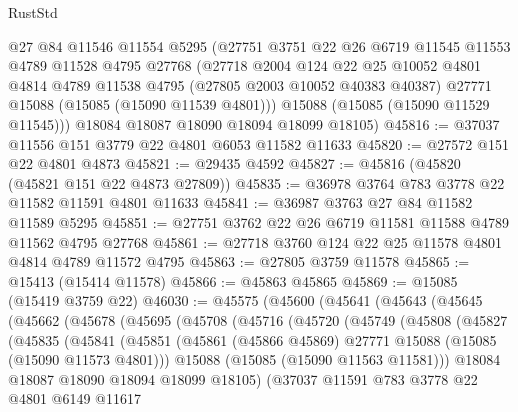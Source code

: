 \begin{lexlean}{RustStd}
\begin{coremodule}
      @27
      @84
      @11546
      @11554
      @5295
      (@27751
        @3751
        @22
        @26
        @6719
        @11545
        @11553
        @4789
        @11528
        @4795
        @27768
        (@27718
          @2004
          @124
          @22
          @25
          @10052
          @4801
          @4814
          @4789
          @11538
          @4795
          (@27805 @2003 @10052 @40383 @40387)
          @27771
          @15088
          (@15085 (@15090 @11539 @4801)))
        @15088
        (@15085 (@15090 @11529 @11545)))
      @18084
      @18087
      @18090
      @18094
      @18099
      @18105)
@45816 := @37037 @11556 @151 @3779 @22 @4801 @6053 @11582 @11633
@45820 := @27572 @151 @22 @4801 @4873
@45821 := @29435 @4592
@45827 := @45816 (@45820 (@45821 @151 @22 @4873 @27809))
@45835 := @36978 @3764 @783 @3778 @22 @11582 @11591 @4801 @11633
@45841 := @36987 @3763 @27 @84 @11582 @11589 @5295
@45851 := @27751 @3762 @22 @26 @6719 @11581 @11588 @4789 @11562 @4795 @27768
@45861 := @27718 @3760 @124 @22 @25 @11578 @4801 @4814 @4789 @11572 @4795
@45863 := @27805 @3759 @11578
@45865 := @15413 (@15414 @11578)
@45866 := @45863 @45865
@45869 := @15085 (@15419 @3759 @22)
@46030 := @45575
    (@45600
      (@45641
        (@45643
          (@45645
            (@45662
              (@45678
                (@45695
                  (@45708
                    (@45716
                      (@45720
                        (@45749
                          (@45808
                            (@45827
                              (@45835
                                (@45841
                                  (@45851
                                    (@45861
                                      (@45866 @45869)
                                      @27771
                                      @15088
                                      (@15085 (@15090 @11573 @4801)))
                                    @15088
                                    (@15085 (@15090 @11563 @11581)))
                                  @18084
                                  @18087
                                  @18090
                                  @18094
                                  @18099
                                  @18105)
                                (@37037
                                  @11591
                                  @783
                                  @3778
                                  @22
                                  @4801
                                  @6149
                                  @11617

\end{coremodule}
\end{lexlean}
